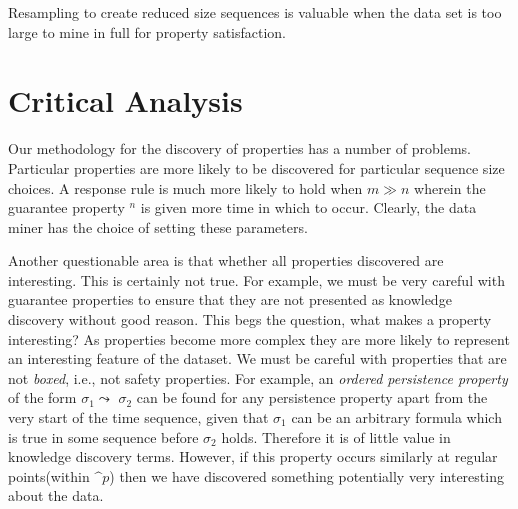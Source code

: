 Resampling to create reduced size sequences is valuable when the data
set is too large to mine in full for property satisfaction.

\section{Critical Analysis}\label{sec:tr_crit_an}

Our methodology for the discovery of properties has a number of
problems. Particular properties are more likely to be discovered for
particular sequence size choices. A response rule  is much
more likely to hold when $m \gg n$ wherein the guarantee property
\diam$^n$ is given more time in which to occur. Clearly, the data
miner has the choice of setting these parameters.

\medskip

Another questionable area is that whether all properties discovered
are interesting. This is certainly not true. For example, we must be
very careful with guarantee properties to ensure that they are not
presented as knowledge discovery without good reason. This begs the
question, what makes a property interesting? As properties become more
complex they are more likely to represent an interesting feature of
the dataset. We must be careful with properties that are not {\em
boxed}, i.e., not safety properties. For example, an {\em ordered
persistence property} of the form $\sigma_1 \leadsto$  $\sigma_2$
can be found for any persistence property apart from the very start of
the time sequence, given that $\sigma_1$ can be an arbitrary formula
which is true in some sequence before  $\sigma_2$ holds.
Therefore it is of little value in knowledge
discovery terms. However, if this property occurs similarly at regular
points(within $\bm^{p}$) then we have discovered something potentially
very interesting about the data.

\medskip


